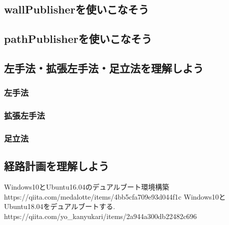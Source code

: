 \documentclass[11pt,a4paper]{jsarticle}
\begin{document}
\newpage



\newpage





\newpage
\subsection{wallPublisherを使いこなそう}




\newpage
\subsection{pathPublisherを使いこなそう}




\newpage
\subsection{左手法・拡張左手法・足立法を理解しよう}
\subsubsection{左手法}



\newpage
\subsubsection{拡張左手法}



\subsubsection{足立法}





\newpage
\subsection{経路計画を理解しよう}



%


\begin{thebibliography}{99}
 Windows10とUbuntu16.04のデュアルブート環境構築\\https://qiita.com/medalotte/items/4bb5cfa709e93d044f1c
 Windows10とUbuntu18.04をデュアルブートする.\\https://qiita.com/yo\_kanyukari/items/2a944a300db22482c696
\end{thebibliography}%
%
\end{document}
